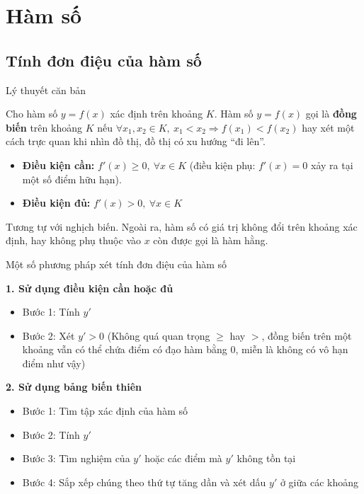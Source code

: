 \chapter{Hàm số}
\label{ch:intro}

\section{Tính đơn điệu của hàm số}

\begin{lythuyetbox}{Lý thuyết căn bản}

Cho hàm số $y = f(x)$ xác định trên khoảng $K$.
Hàm số $y = f(x)$ gọi là \textbf{đồng biến} trên khoảng $K$ nếu $\forall x_1, x_2 \in K,\ x_1 < x_2 \Rightarrow f(x_1) < f(x_2)$ hay xét một cách trực quan khi nhìn đồ thị, đồ thị có xu hướng “đi lên”.

\begin{itemize}
    \item \textbf{Điều kiện cần:} $f'(x) \geq 0,\ \forall x \in K$ (điều kiện phụ: $f'(x) = 0$ xảy ra tại một số điểm hữu hạn).
    \item \textbf{Điều kiện đủ:} $f'(x) > 0,\ \forall x \in K$
\end{itemize}

Tương tự với nghịch biến. Ngoài ra, hàm số có giá trị không đổi trên khoảng xác định, hay không phụ thuộc vào $x$ còn được gọi là hàm hằng.

\end{lythuyetbox}

\begin{lythuyetbox}{Một số phương pháp xét tính đơn điệu của hàm số}

\textbf{1. Sử dụng điều kiện cần hoặc đủ}

\begin{itemize}
    \item Bước 1: Tính $y'$
    \item Bước 2: Xét $y' > 0$ (Không quá quan trọng $\geq$ hay $>$, đồng biến trên một khoảng vẫn có thể chứa điểm có đạo hàm bằng 0, miễn là không có vô hạn điểm như vậy)
\end{itemize}

\textbf{2. Sử dụng bảng biến thiên}

\begin{itemize}
    \item Bước 1: Tìm tập xác định của hàm số
    \item Bước 2: Tính $y'$
    \item Bước 3: Tìm nghiệm của $y'$ hoặc các điểm mà $y'$ không tồn tại
    \item Bước 4: Sắp xếp chúng theo thứ tự tăng dần và xét dấu $y'$ ở giữa các khoảng
\end{itemize}

\end{lythuyetbox}

